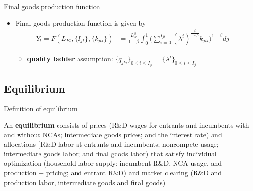 \documentclass[english,usenames,dvipsnames,handout]{beamer}
\begin{document}
\begin{frame}{Final goods production function}\label{definition:final_goods_production}\hyperlink{main:final_goods_production}{}
	\begin{itemize}
		\item Final goods production function is given by
		\begin{align*}
		Y_t = F(L_{Ft},\{I_{jt}\},\{k_{jti}\}) &= \frac{L_{Ft}^{\beta}}{1-\beta} \int_0^1 \Big(\sum_{i = 0}^{I_{jt}} (\lambda^{i})^{\frac{\beta}{1-\beta}} k_{jti} \Big)^{1-\beta} dj 
		\end{align*}
		\begin{itemize}
			\item \alert{\textbf{quality ladder}} assumption: $\{q_{jti}\}_{0 \le i \le I_{jt}} = \{\lambda^i\}_{0 \le i \le I_{jt}}$
		\end{itemize}
	\end{itemize}
\end{frame}


\subsection{Equilibrium}

\begin{frame}{Definition of equilibrium}\label{definition:equilibrium}\hyperlink{definition:symmetric_bgp}{}
	\begin{definition}
		An \textbf{equilibrium} consists of prices (R\&D wages for entrants and incumbents with and without NCAs; intermediate goods prices; and the interest rate) and allocations (R\&D labor at entrants and incumbents; noncompete usage; intermediate goods labor; and final goods labor) that satisfy individual optimization (household labor supply; incumbent R\&D, NCA usage, and production + pricing; and entrant R\&D) and market clearing (R\&D and production labor, intermediate goods and final goods)
	\end{definition}
\end{frame}
\end{document}
